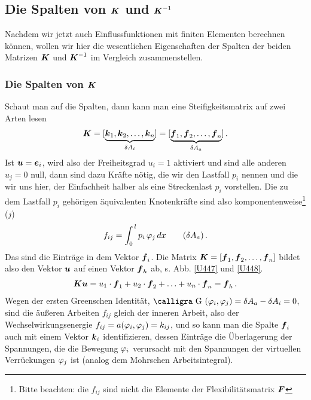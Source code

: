 {\textcolor{sectionTitleBlue}{\section{Die Spalten von $\mbox{\boldmath $K$}$ und $\mbox{\boldmath $K$}^{-1}$}}

Nachdem wir jetzt auch Einflussfunktionen mit finiten Elementen berechnen k\"{o}nnen, wollen wir hier die wesentlichen Eigenschaften der Spalten der beiden Matrizen $\mbox{\boldmath $K$}$ und $\mbox{\boldmath $K$}^{-1}$ im Vergleich zusammenstellen.

{\textcolor{sectionTitleBlue}{\subsubsection*{Die Spalten von $\mbox{\boldmath $K$}$}}}
Schaut man auf die Spalten, dann kann man eine Steifigkeitsmatrix auf zwei Arten lesen
\begin{align} 
\mbox{\boldmath $K$} = [\underbrace{\mbox{\boldmath $k$}_1, \mbox{\boldmath $k$}_2, \ldots, \mbox{\boldmath $k$}_n}_{\delta A_i}] = [\underbrace{\mbox{\boldmath $f$}_1, \mbox{\boldmath $f$}_2, \ldots, \mbox{\boldmath $f$}_n}_{\delta A_a}]\,.
\end{align}
Ist $\mbox{\boldmath $u$} = \mbox{\boldmath $e$}_i $, wird also der Freiheitsgrad $u_i = 1 $ aktiviert und sind alle anderen $u_j = 0 $ null,
dann sind dazu Kr\"{a}fte n\"{o}tig, die wir den Lastfall $p_i $ nennen und die wir uns hier, der Einfachheit halber als eine Streckenlast $p_i$ vorstellen. Die zu dem Lastfall $p_i$ geh\"{o}rigen \"{a}quivalenten Knotenkr\"{a}fte sind also komponentenweise\footnote{Bitte beachten: die $f_{ij}$ sind nicht die Elemente der Flexibilit\"{a}tsmatrix $\mbox{\boldmath $F$}$} ($j$)
\begin{align}
f_{ij}    = \int_0^{\,l} p_i\,\varphi_j\,dx \qquad (\delta A_a)\,.
\end{align}
Das sind die Eintr\"{a}ge in dem Vektor $\mbox{\boldmath $f$}_i $. 
Die Matrix $\mbox{\boldmath $K$} = [\mbox{\boldmath $f$}_1, \mbox{\boldmath $f$}_2, \ldots, \mbox{\boldmath $f$}_n]$ bildet also den Vektor $\mbox{\boldmath $u$}$ auf einen Vektor $\mbox{\boldmath $f$}_h$ ab, s. Abb. \ref{U447} und \ref{U448}.
\begin{align}
\mbox{\boldmath $K$} \mbox{\boldmath $u$} = u_1 \cdot \mbox{\boldmath $f$}_1 + u_2 \cdot \mbox{\boldmath $f$}_2 + \ldots + u_n \cdot \mbox{\boldmath $f$}_n = \mbox{\boldmath $f$}_h\,.
\end{align}
Wegen der ersten Greenschen Identit\"{a}t, $\text{\normalfont\calligra G\,\,}(\Np_i,\Np_j) = \delta A_a - \delta A_i = 0$, sind die \"{a}u{\ss}eren Arbeiten $f_{ij}$ gleich der inneren Arbeit, also der Wechselwirkungsenergie $f_{ij} = a(\varphi_i,\varphi_j) = k_{ij}$, und so kann man die Spalte $\mbox{\boldmath $f$}_i$ auch mit einem Vektor $\mbox{\boldmath $k$}_i $ identifizieren, dessen Eintr\"{a}ge die \"{U}berlagerung der Spannungen, die die Bewegung $\varphi_i $ verursacht mit den Spannungen der
virtuellen Verr\"{u}ckungen $\varphi_j $ ist (analog dem Mohrschen Arbeitsintegral).

}
